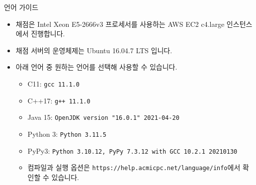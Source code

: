{
    \indent
    \Large
    
    언어 가이드
}

\begin{itemize}[noitemsep]

    \item 채점은 Intel Xeon E5-2666v3 프로세서를 사용하는 AWS EC2 c4.large 인스턴스에서 진행합니다.
    \item 채점 서버의 운영체제는 Ubuntu 16.04.7 LTS 입니다.
    \item 아래 언어 중 원하는 언어를 선택해 사용할 수 있습니다.
    
    \begin{itemize}[noitemsep,topsep=0pt]
        \item C11: \texttt{gcc 11.1.0} %
        \item C++17: \texttt{g++ 11.1.0} %
        \item Java 15: \texttt{OpenJDK version "16.0.1" 2021-04-20} %
        \item Python 3: \texttt{Python 3.11.5} %
        \item PyPy3: \texttt{Python 3.10.12, PyPy 7.3.12 with GCC 10.2.1 20210130} %
        \item 컴파일과 실행 옵션은 \texttt{https://help.acmicpc.net/language/info}에서 확인할 수 있습니다.
        

\end{itemize}
\end{itemize}
